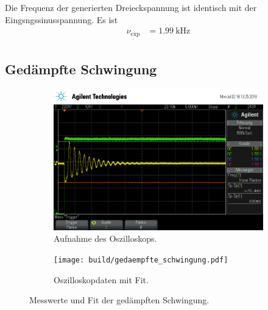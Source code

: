 Die Frequenz der generierten Dreieckspannung ist identisch mit der Eingsngssinusspannung.
Es ist
\begin{align*}
  \nu_\text{exp} &= \SI{1.99}{\kilo\hertz} \\
\end{align*}

\subsection{Ged\"ampfte Schwingung}

\begin{figure}[ht]
  \centering
  \begin{subfigure}{\textwidth}
    \centering
    \includegraphics[height=0.3\textheight]{data/scope_275.png}
    \caption{Aufnahme des Oszilloskops.}%
    \label{fig:gedaempft_oszilloskop}
  \end{subfigure}
  \begin{subfigure}{\textwidth}
    \centering
    \texttt{[image: build/gedaempfte\_schwingung.pdf]}
    \caption{Oszilloskopdaten mit Fit.}%
    \label{fig:gedaempft_fit}
  \end{subfigure}
  \caption{Messwerte und Fit der gedämpften Schwingung.}%
  \label{fig:gedaempft}
\end{figure}


